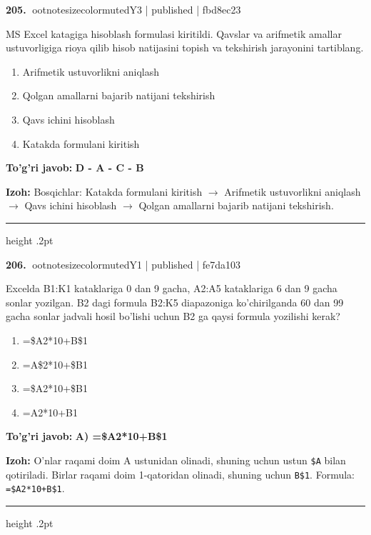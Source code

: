 \documentclass[10pt,a4paper]{article}
\begin{document}
\textbf{\color{ink}205.} {ootnotesizecolor{muted}Y3 | published | fbd8ec23}
\par
MS Excel katagiga hisoblash formulasi kiritildi. Qavslar va arifmetik amallar ustuvorligiga rioya qilib hisob natijasini topish va tekshirish jarayonini tartiblang.
\begin{enumerate}[label=\Alph*),leftmargin=9mm]
\item Arifmetik ustuvorlikni aniqlash
\item Qolgan amallarni bajarib natijani tekshirish
\item Qavs ichini hisoblash
\item Katakda formulani kiritish
\end{enumerate}
\begin{tcolorbox}[enhanced,breakable,colback=teal!4,colframe=teal!55!black,boxrule=0.45pt,arc=1.2mm,left=2.8mm,right=2.8mm,top=2mm,bottom=2mm]
\textbf{\color{teal}To'g'ri javob:} \textbf{D - A - C - B}
\par\smallskip
\textbf{Izoh:} Bosqichlar: Katakda formulani kiritish \ensuremath{\rightarrow} Arifmetik ustuvorlikni aniqlash \ensuremath{\rightarrow} Qavs ichini hisoblash \ensuremath{\rightarrow} Qolgan amallarni bajarib natijani tekshirish.
\end{tcolorbox}
\vspace{2mm}\hrule height .2pt\vspace{2mm}

\textbf{\color{ink}206.} {ootnotesizecolor{muted}Y1 | published | fe7da103}
\par
Excelda B1:K1 kataklariga 0 dan 9 gacha, A2:A5 kataklariga 6 dan 9 gacha sonlar yozilgan. B2 dagi formula B2:K5 diapazoniga ko'chirilganda 60 dan 99 gacha sonlar jadvali hosil bo'lishi uchun B2 ga qaysi formula yozilishi kerak?
\begin{enumerate}[label=\Alph*),leftmargin=9mm]
\item =\$A2*10+B\$1
\item =A\$2*10+\$B1
\item =\$A2*10+\$B1
\item =A2*10+B1
\end{enumerate}
\begin{tcolorbox}[enhanced,breakable,colback=teal!4,colframe=teal!55!black,boxrule=0.45pt,arc=1.2mm,left=2.8mm,right=2.8mm,top=2mm,bottom=2mm]
\textbf{\color{teal}To'g'ri javob:} \textbf{A) =\$A2*10+B\$1}
\par\smallskip
\textbf{Izoh:} O'nlar raqami doim A ustunidan olinadi, shuning uchun ustun \texttt{\$A} bilan qotiriladi. Birlar raqami doim 1-qatoridan olinadi, shuning uchun \texttt{B\$1}. Formula: \texttt{=\$A2*10+B\$1}.
\end{tcolorbox}
\vspace{2mm}\hrule height .2pt\vspace{2mm}
\end{document}
